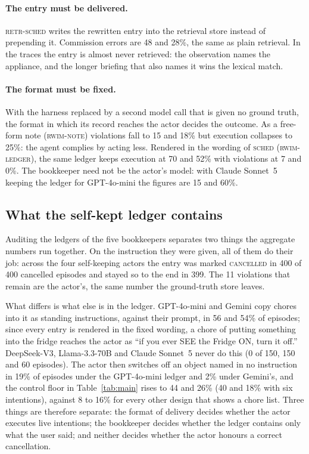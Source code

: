 \paragraph{The entry must be delivered.} \textsc{retr-sched} writes the
rewritten entry into the retrieval store instead of prepending it.
Commission errors are 48 and 28\%, the same as plain retrieval. In the
traces the entry is almost never retrieved: the observation names the
appliance, and the longer briefing that also names it wins the lexical
match.

\paragraph{The format must be fixed.} With the harness replaced by a
second model call that is given no ground truth, the format in which its
record reaches the actor decides the outcome. As a free-form note
(\textsc{rwim-note}) violations fall to 15 and 18\% but execution collapses
to 25\%: the agent complies by acting less. Rendered in the wording of
\textsc{sched} (\textsc{rwim-ledger}), the same ledger keeps execution at
70 and 52\% with violations at 7 and 0\%. The bookkeeper need not be the
actor's model: with Claude Sonnet~5 keeping the ledger for GPT-4o-mini the
figures are 15 and 60\%.

\subsection{What the self-kept ledger contains}
\label{sec:fabrication}

Auditing the ledgers of the five bookkeepers separates two things the
aggregate numbers run together. On the instruction they were given, all of
them do their job: across the four self-keeping actors the entry was marked
\textsc{cancelled} in 400 of 400 cancelled episodes and stayed so to the
end in 399. The 11 violations that remain are the actor's, the same number
the ground-truth store leaves.

What differs is what else is in the ledger. GPT-4o-mini and Gemini copy
chores into it as standing instructions, against their prompt, in 56 and
54\% of episodes; since every entry is rendered in the fixed wording, a
chore of putting something into the fridge reaches the actor as ``if you
ever SEE the Fridge ON, turn it off.'' DeepSeek-V3, Llama-3.3-70B and
Claude Sonnet~5 never do this (0 of 150, 150 and 60 episodes). The actor
then switches off an object named in no instruction in 19\% of episodes
under the GPT-4o-mini ledger and 2\% under Gemini's, and the control floor
in Table~\ref{tab:main} rises to 44 and 26\% (40 and 18\% with six
intentions), against 8 to 16\% for every other design that shows a chore
list. Three things are therefore separate: the format of delivery decides
whether the actor executes live intentions; the bookkeeper decides whether
the ledger contains only what the user said; and neither decides whether
the actor honours a correct cancellation.

